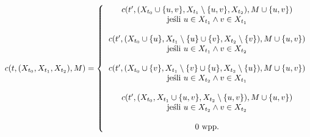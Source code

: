 \documentclass[12pt, oneside]{report}
\begin{document}
\[
c(t, (X_{t_0}, X_{t_1}, X_{t_2}), M) =  
\left \{
  \begin{tabular}{ccc}
  $c(t', (X_{t_0} \cup \{u, v\}, X_{t_1} \setminus \{u, v\}, X_{t_2}), M \cup \{u, v\})$\\
  jeśli $u \in X_{t_1} \wedge v \in X_{t_1}$\\  
  \\
  $c(t', (X_{t_0} \cup \{u\}, X_{t_1} \setminus \{u\} \cup \{v\}, X_{t_2} \setminus \{v\}), M \cup \{u, v\})$\\
  jeśli $u \in X_{t_1} \wedge v \in X_{t_2}$\\
  \\
  $c(t', (X_{t_0} \cup \{v\}, X_{t_1} \setminus \{v\} \cup \{u\}, X_{t_2} \setminus \{u\}), M \cup \{u, v\})$\\
  jeśli $u \in X_{t_2} \wedge v \in X_{t_1}$\\
  \\
  $c(t', (X_{t_0}, X_{t_1} \cup \{u, v\}, X_{t_2} \setminus \{u, v\}), M \cup \{u, v\})$\\
  jeśli $u \in X_{t_2} \wedge v \in X_{t_2}$\\
  \\  
  $0$ wpp.\\
  \end{tabular}
\right. 
\]
\end{document}
